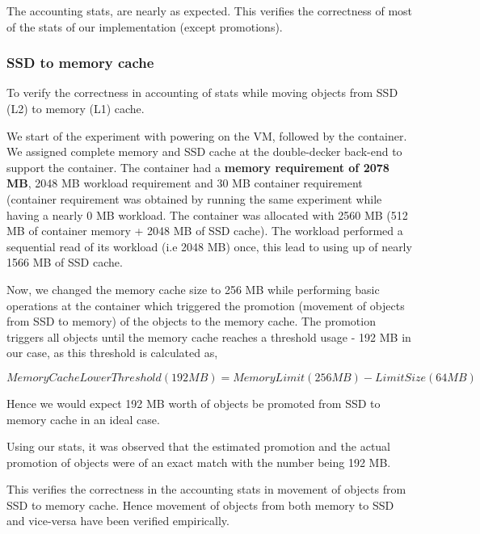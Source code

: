 	  
	    The accounting stats, are nearly as expected. This verifies the correctness of most of the stats of our implementation (except promotions).
	    
	
	\subsubsection{SSD to memory cache}
	  
	    To verify the correctness in accounting of stats while moving objects from SSD (L2) to memory (L1) cache.
	    
	      We start of the experiment with powering on the VM, followed by the container. We assigned complete memory and SSD cache 
	    at the double-decker back-end to support the container. The container had a \textbf{memory requirement of 2078 MB}, 2048 MB workload
	    requirement and 30 MB container requirement (container requirement was obtained by running the same experiment while having
	    a nearly 0 MB workload. The container was allocated with 2560 MB (512 MB of container memory + 2048 MB of SSD cache).
	    The workload performed a sequential read of its workload (i.e 2048 MB) once, this lead to using up of nearly 1566 MB of SSD cache.
	    
	    Now, we changed the memory cache size to 256 MB while performing basic operations at the container which triggered the promotion 
	    (movement of objects from SSD to memory) of the objects to the memory cache. The promotion triggers all objects until the memory 
	    cache reaches a threshold usage - 192 MB in our case, as this threshold is calculated as,
	    
	    \begin{equation}
	      MemoryCacheLowerThreshold (192 MB) = MemoryLimit (256 MB) - LimitSize (64 MB)
	    \end{equation}
	    
	    Hence we would expect 192 MB worth of objects be promoted from SSD to memory cache in an ideal case.
	    
	    
	    Using our stats, it was observed that the estimated promotion and the actual promotion of objects were of an exact match with 
	    the number being 192 MB.
	    
	    This verifies the correctness in the accounting stats in movement of objects from SSD to memory cache. Hence movement 
	    of objects from both memory to SSD and vice-versa have been verified empirically.
  
